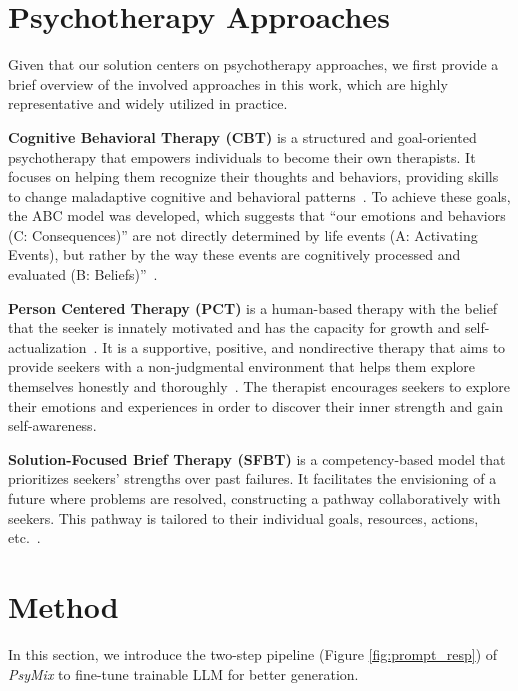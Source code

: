 \section{Psychotherapy Approaches}
\label{sec:psychotherapy}

Given that our solution centers on psychotherapy approaches, we first provide a brief overview of the involved approaches in this work, which are highly representative and widely utilized in practice.

\textbf{Cognitive Behavioral Therapy (CBT)} is a structured and goal-oriented psychotherapy that empowers individuals to become their own therapists. It focuses on helping them recognize their thoughts and behaviors, providing skills to change maladaptive cognitive and behavioral patterns~\cite{Kristina2013KeyCBT}. To achieve these goals, the ABC model was developed, which suggests that ``our emotions and behaviors (C: Consequences)'' are not directly determined by life events (A: Activating Events), but rather by the way these events are cognitively processed and evaluated (B: Beliefs)''~\cite{Oltean2017AnEA}.

\textbf{Person Centered Therapy (PCT)} is a human-based therapy with the belief that the seeker is innately motivated and has the capacity for growth and self-actualization~\cite{Rogers1946SignificantAO}. It is a supportive, positive, and nondirective therapy that aims to provide seekers with a non-judgmental environment that helps them explore themselves honestly and thoroughly~\cite{Elliott2013PCT}. The therapist encourages seekers to explore their emotions and experiences in order to discover their inner strength and gain self-awareness.

\textbf{Solution-Focused Brief Therapy (SFBT)} is a competency-based model that prioritizes seekers' strengths over past failures. It facilitates the envisioning of a future where problems are resolved, constructing a pathway collaboratively with seekers. This pathway is tailored to their individual goals, resources, actions, etc.~\cite{Trepper2014SolutionFocusedTT}.

\section{Method}
\label{sec:method}

In this section, we introduce the two-step pipeline (Figure \ref{fig:prompt_resp}) of \textit{PsyMix} to fine-tune trainable LLM for better generation.

